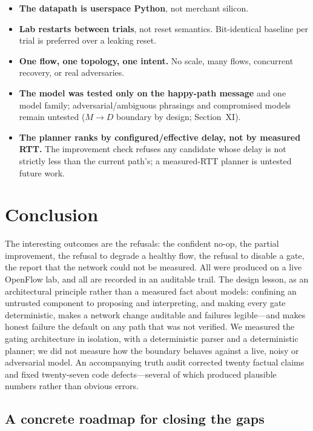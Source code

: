\documentclass[conference]{IEEEtran}
\begin{document}
\begin{itemize}
    the installed rules in place. There is no transactional undo.
  \item \textbf{The datapath is userspace Python}, not merchant silicon.
  \item \textbf{Lab restarts between trials}, not reset semantics.
    Bit-identical baseline per trial is preferred over a leaking reset.
  \item \textbf{One flow, one topology, one intent.} No scale, many
    flows, concurrent recovery, or real adversaries.
  \item \textbf{The model was tested only on the happy-path message} and
    one model family; adversarial/ambiguous phrasings and compromised
    models remain untested ($M\to D$ boundary by design; Section~XI).
  \item \textbf{The planner ranks by configured/effective delay, not by
    measured RTT.} The improvement check refuses any candidate whose delay
    is not strictly less than the current path's; a measured-RTT planner is
    untested future work.
\end{itemize}

\section{Conclusion}

The interesting outcomes are the refusals: the confident no-op, the partial
improvement, the refusal to degrade a healthy flow, the refusal to disable
a gate, the report that the network could not be measured. All were
produced on a live OpenFlow lab, and all are recorded in an auditable
trail. The design lesson, as an architectural principle rather than a
measured fact about models: confining an untrusted component to proposing
and interpreting, and making every gate deterministic, makes a network
change auditable and failures legible---and makes honest failure the
default on any path that was not verified. We measured the gating
architecture in isolation, with a deterministic parser and a deterministic
planner; we did not measure how the boundary behaves against a live, noisy
or adversarial model. An accompanying truth audit corrected twenty factual
claims and fixed twenty-seven code defects---several of which produced
plausible numbers rather than obvious errors.
\subsection*{A concrete roadmap for closing the gaps}
\end{document}

